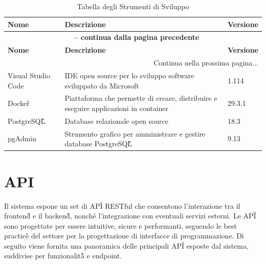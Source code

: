 \documentclass[a4paper,11pt]{article}
\begin{document}
\begin{longtable}{|p{2cm}|p{7cm}|p{3cm}|}
\caption{Tabella degli Strumenti di Sviluppo}\label{tab:strumenti_sviluppo}\\
\hline
\rowcolor{primaryblue!40}
\textbf{Nome} & \textbf{Descrizione} & \textbf{Versione} \\
\hline
\endfirsthead

\multicolumn{3}{c}{{\bfseries \tablename\ \thetable{} -- continua dalla pagina precedente}}\\
\hline
\rowcolor{primaryblue!40}
\textbf{Nome} & \textbf{Descrizione} & \textbf{Versione} \\
\hline
\endhead

\hline
\multicolumn{3}{|r|}{{Continua nella prossima pagina...}}\\
\hline
\endfoot

\hline
\endlastfoot
Visual Studio Code & IDE open source per lo sviluppo software sviluppato da Microsoft & 1.114 \\
\hline
Docker\G{} & Piattaforma che permette di creare, distribuire e eseguire applicazioni in container & 29.3.1 \\
\hline
PostgreSQL\G{} & Database relazionale open source & 18.3 \\
\hline
pgAdmin & Strumento grafico per amministrare e gestire database PostgreSQL\G{} & 9.13 \\
\end{longtable}

\section{API}
Il sistema espone un set di API\G{} RESTful che consentono l'interazione tra il frontend\G{} e il backend\G{}, 
nonché l'integrazione con eventuali servizi esterni. Le API\G{} sono progettate per essere intuitive, sicure e 
performanti, seguendo le best practice\G{} del settore per la progettazione di interfacce di programmazione. 
Di seguito viene fornita una panoramica delle principali API\G{} esposte dal sistema, suddivise per funzionalità\G{} e endpoint.
\end{document}
